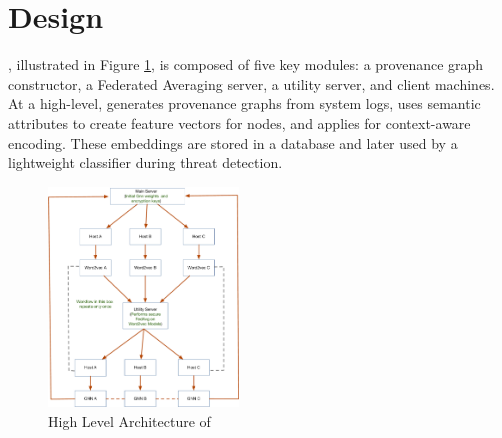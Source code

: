 \section{\Sys Design}
\label{sec:methodology}

\Sys, illustrated in Figure \ref{arch}, is composed of five key modules: a provenance graph constructor, a Federated Averaging server, a utility server, and client machines. At a high-level, \Sys generates provenance graphs from system logs, uses semantic attributes to create feature vectors for nodes, and applies \gnnshort for context-aware encoding. These embeddings are stored in a database and later used by a lightweight classifier during threat detection.

\begin{figure}[t!]
    \centering
    \includegraphics[width=0.45\textwidth]{fig/arch.pdf}
    \caption{High Level Architecture of \Sys}
    \vspace{-3ex}
    \label{arch}
  \end{figure}
